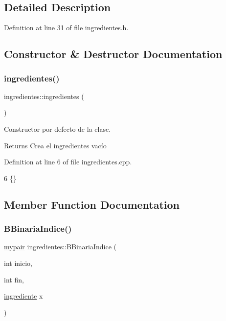 \subsection{Detailed Description}


Definition at line 31 of file ingredientes.\+h.



\subsection{Constructor \& Destructor Documentation}
\mbox{\label{classingredientes_adb3e000aa798184c7253c401f165c1a5}} 
\subsubsection{\texorpdfstring{ingredientes()}{ingredientes()}}
{\footnotesize\ttfamily ingredientes\+::ingredientes (\begin{DoxyParamCaption}{ }\end{DoxyParamCaption})}



Constructor por defecto de la clase. 

\begin{DoxyReturn}{Returns}
Crea el ingredientes vacío 
\end{DoxyReturn}


Definition at line 6 of file ingredientes.\+cpp.


\begin{DoxyCode}
6 \{\}
\end{DoxyCode}


\subsection{Member Function Documentation}
\mbox{\label{classingredientes_abfbdb4c010ef4a72c750a077645eb4f0}} 
\subsubsection{\texorpdfstring{B\+Binaria\+Indice()}{BBinariaIndice()}}
{\footnotesize\ttfamily \hyperlink{structmypair}{mypair} ingredientes\+::\+B\+Binaria\+Indice (\begin{DoxyParamCaption}\item[{int}]{inicio,  }\item[{int}]{fin,  }\item[{\hyperlink{classingrediente}{ingrediente}}]{x }\end{DoxyParamCaption})}



